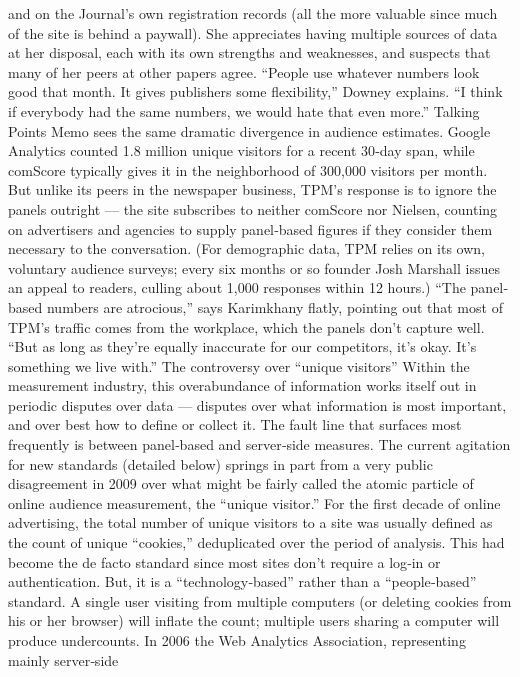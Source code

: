 and on the Journal’s own registration records (all the more valuable since
much of the site is behind a paywall). She appreciates having multiple
sources of data at her disposal, each with its own strengths and
weaknesses, and suspects that many of her peers at other papers agree.
``People use whatever numbers look good that month. It gives publishers
some flexibility,'' Downey explains. ``I think if everybody had the same
numbers, we would hate that even more.''
Talking Points Memo sees the same dramatic divergence in audience
estimates. Google Analytics counted 1.8 million unique visitors for a
recent 30‐day span, while comScore typically gives it in the neighborhood
of 300,000 visitors per month. But unlike its peers in the newspaper
business, TPM’s response is to ignore the panels outright — the site
subscribes to neither comScore nor Nielsen, counting on advertisers and
agencies to supply panel‐based figures if they consider them necessary to
the conversation. (For demographic data, TPM relies on its own, voluntary
audience surveys; every six months or so founder Josh Marshall issues an
appeal to readers, culling about 1,000 responses within 12 hours.)
``The panel‐based numbers are atrocious,'' says Karimkhany flatly,
pointing out that most of TPM’s traffic comes from the workplace, which
the panels don’t capture well. ``But as long as they’re equally inaccurate
for our competitors, it’s okay. It’s something we live with.''
The controversy over ``unique visitors''
Within the measurement industry, this overabundance of information
works itself out in periodic disputes over data — disputes over what
information is most important, and over best how to define or collect it.
The fault line that surfaces most frequently is between panel‐based and
server‐side measures. The current agitation for new standards (detailed
below) springs in part from a very public disagreement in 2009 over what
might be fairly called the atomic particle of online audience measurement,
the ``unique visitor.''
For the first decade of online advertising, the total number of unique
visitors to a site was usually defined as the count of unique ``cookies,'' deduplicated
over the period of analysis. This had become the de facto
standard since most sites don’t require a log‐in or authentication. But, it is
a ``technology‐based'' rather than a ``people‐based'' standard. A single
user visiting from multiple computers (or deleting cookies from his or her
browser) will inflate the count; multiple users sharing a computer will
produce undercounts.
In 2006 the Web Analytics Association, representing mainly server‐side
